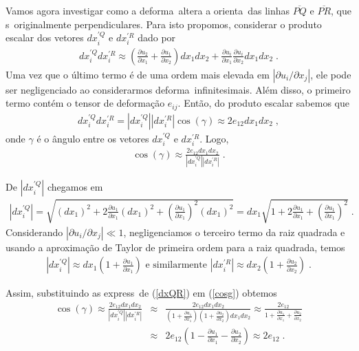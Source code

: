 \begin{itemize}
Vamos agora investigar como a deforma\cao\ altera a orienta\cao\
das linhas $\overline{PQ}$ e $\overline{PR}$, que s\ao\
originalmente perpendiculares. Para isto propomos, considerar o
produto escalar dos vetores $dx_i^{'Q}$ e $dx_i^{'R}$ dado por
\begin{eqnarray}
dx_i^{'Q} dx_i^{'R} \approx \left( \frac{\partial u_2}{\partial x_1}
+ \frac{\partial u_1}{\partial x_2}\right) dx_1 dx_2 +
\frac{\partial u_i}{\partial x_1}  \frac{\partial u_i}
{\partial x_2} dx_1 dx_2 \; .
\end{eqnarray}
Uma vez que o \'ultimo termo \'e de uma ordem mais elevada em
$|\partial u_i/ \partial x_j|$, ele pode ser negligenciado ao considerarmos
deforma\coes\ infinitesimais. Al\'em disso, o primeiro termo cont\'em
o tensor de deforma\c{c}\~ao $e_{ij}$. Ent\~ao, do produto escalar sabemos que
\begin{eqnarray}
dx_i^{'Q} dx_i^{'R} = |dx_i^{'Q}| |dx_i^{'R}| \cos(\gamma)
\approx 2e_{12}dx_1 dx_2 \; ,
\end{eqnarray}
onde $\gamma$ \'e o \^angulo entre os vetores $dx_i^{'Q}$ e
$dx_i^{'R}$. Logo,
\begin{eqnarray} \label{cosg}
\cos(\gamma) \approx \frac{2e_{12}dx_1 dx_2}{|dx_i^{'Q}|
|dx_i^{'R}|} \; .
\end{eqnarray}

De $|dx_i^{'Q}|$ chegamos em
\begin{eqnarray*}
|dx_i^{'Q}| = \sqrt{(dx_1)^2 + 2 \frac{\partial u_1}{\partial x_1}
(dx_1)^2 + \left( \frac{\partial u_1}{\partial x_1} \right)^2
(dx_1)^2} = dx_1 \sqrt{1 + 2 \frac{\partial u_1}{\partial x_1}
+ \left( \frac{\partial u_1}{\partial x_1} \right)^2} \; .
\end{eqnarray*}
Considerando $|\partial u_i/ \partial x_j| \ll 1$, negligenciamos o terceiro termo
da raiz quadrada e usando a aproxima\c{c}\~ao de Taylor de primeira ordem
para a raiz quadrada, temos
\begin{eqnarray} \label{dxQR}
|dx_i^{'Q}| \approx dx_1 \left(1+\frac{\partial u_1}{\partial x_1}\right)
\mbox{ e similarmente } |dx_i^{'R}|
\approx dx_2 \left(1+\frac{\partial u_2}{\partial x_2}\right) \; .
\end{eqnarray}

Assim, substituindo as express\oes\ de (\ref{dxQR}) em (\ref{cosg})
obtemos
\begin{eqnarray} \label{app}
\cos(\gamma) \approx \frac{2e_{12}dx_1 dx_2}{|dx_i^{'Q}|
|dx_i^{'R}|} &\approx& \frac{2e_{12}dx_1 dx_2}{\left(1+\frac{\partial u_1}
{\partial x_1}\right) \left(1+\frac{\partial u_2}{\partial x_2}
\right) dx_1  dx_2} \approx \frac{2e_{12}}{1 + \frac{\partial u_1}
{\partial x_1} + \frac{\partial u_2}{\partial x_2}} \nonumber \\
&\approx& 2e_{12} \left(1 - \frac{\partial u_1}{\partial x_1} -
\frac{\partial u_2}{\partial x_2} \right) \approx 2e_{12} \; .
\end{eqnarray}


\end{itemize}
